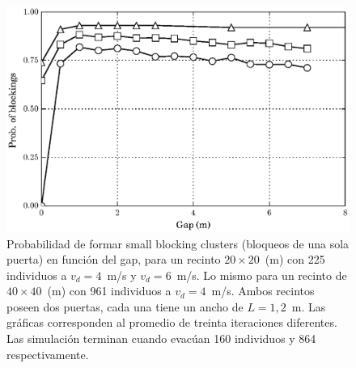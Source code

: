 \begin{figure}[H]
    \centering
    \includegraphics[scale=0.8]{figuras/proba_vsgap_all_big.eps}
    \caption[width=5cm]{Probabilidad de formar small blocking clusters (bloqueos de una sola puerta) en función del gap, para un recinto $20\times 20$~(m) con 225 individuos a $v_d=4$~m/s y $v_d=6$~m/s. Lo mismo para un recinto de $40\times 40$~(m) con 961 individuos a $v_d=4$~m/s. Ambos recintos poseen dos puertas, cada una tiene un ancho de $L=1,2$~m. Las gráficas corresponden al promedio de treinta iteraciones diferentes. Las simulación terminan cuando evacúan 160 individuos y 864 respectivamente.}
    \label{proba_vsgap_all}
\end{figure}






